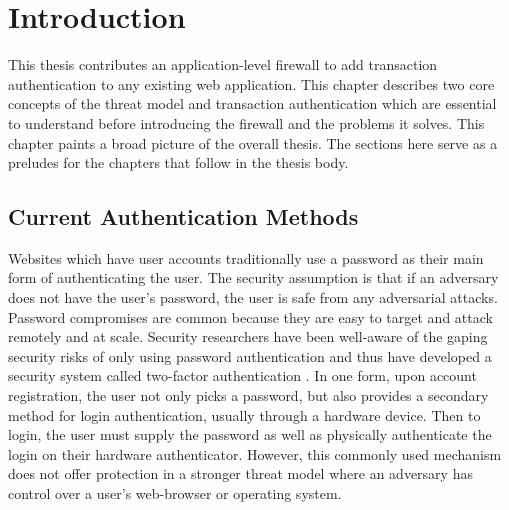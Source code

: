 \chapter{Introduction}

This thesis contributes an application-level firewall to add transaction authentication to any existing web application. This chapter describes two core concepts of the threat model and transaction authentication which are essential to understand before introducing the firewall and the problems it solves. This chapter paints a broad picture of the overall thesis. The sections here serve as a preludes for the chapters that follow in the thesis body.





\section{Current Authentication Methods}

Websites which have user accounts traditionally use a password as their main form of authenticating the user. The security assumption is that if an adversary does not have the user's password, the user is safe from any adversarial attacks. Password compromises are common \cite{TODO-passwords} because they are easy to target and attack remotely and at scale. Security researchers have been well-aware of the gaping security risks of only using password authentication and thus have developed a security system called two-factor authentication \cite{TODO-2FA}. In one form, upon account registration, the user not only picks a password, but also provides a secondary method for login authentication, usually through a hardware device. Then to login, the user must supply the password as well as physically authenticate the login on their hardware authenticator. However, this commonly used mechanism does not offer protection in a stronger threat model where an adversary has control over a user's web-browser or operating system. 

